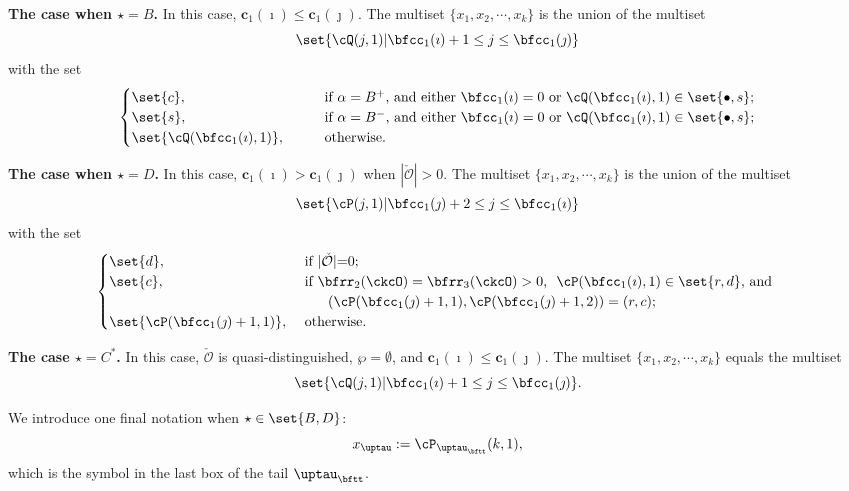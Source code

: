 \documentclass[12pt]{amsart}
\newcommand{\CO}{{\mathcal {O}}}
\numberwithin{equation}{section}
\theoremstyle{remark}
\begin{document}
{\bfseries The case when $\star = B$.} In this case,  $\mathbf c_1(\imath)\leq \mathbf c_1(\jmath)$. The multiset $\{x_1, x_2, \cdots, x_k\}$ is the
union of the multiset
\[
  \set{\cQ(j,1)| \bfcc_{1}(\imath)+1 \leq j \leq  \bfcc_{1}(\jmath) }
\]
with the set
\[
  \begin{cases}
 \set{c}, &
 \qquad
  \text{if $\alpha = B^+$, and either $\bfcc_{1}(\imath)=0$ or $\cQ(\bfcc_{1}(\imath),1)\in \set{\bullet,s}$};  \\
 \set{s},&
  \qquad \text{if $\alpha = B^-$, and either $\bfcc_{1}(\imath)=0$ or $\cQ(\bfcc_{1}(\imath),1)\in \set{\bullet,s}$}; \\
\set{\cQ(\bfcc_{1}(\imath),1)},&
\qquad
\text{otherwise.}
\end{cases}
\]

{\bfseries The case when $\star = D$.} In this case,  $\mathbf c_1(\imath)>\mathbf c_1(\jmath)$ when $|\check \CO|>0$.
The multiset $\{x_1, x_2, \cdots, x_k\}$
is the union of the multiset
\[
\set{\cP(j,1)| \bfcc_{1}(\jmath)+2 \leq j \leq \bfcc_{1}(\imath)}
\]
with the set
\[
\begin{cases}
 \set{d}, &\textrm{ if $|\check \CO|$=0};\\
    \set{c},                          &
    \ \text{if $\bfrr_2(\ckcO)=\bfrr_3(\ckcO)>0$, $\ \cP(\bfcc_1(\imath),1)\in \set{r,d}$,   and }\\   &\qquad ( \cP(\bfcc_{1}(\jmath)+1,1), \cP(\bfcc_{1}(\jmath)+1,2)) = (r,c);                                                                     \\
    \set{\cP(\bfcc_{1}(\jmath)+1,1)}, &
    \    \text{otherwise.}
  \end{cases}
\]


{\bfseries The case $\star = C^*$.}  In this case,  $\check \CO$ is quasi-distinguished,
$\wp=\emptyset$,
and $\mathbf c_1(\imath)\leq \mathbf c_1(\jmath)$.
The multiset $\{x_1, x_2, \cdots, x_k\}$
equals the multiset
\[
  \set{\cQ(j,1)| \bfcc_{1}(\imath)+1 \leq j \leq  \bfcc_{1}(\jmath) }.
\]


We introduce one final notation when $\star \in \set{B,D}$:
\[
x_\uptau := \cP_{\uptau_\bftt}(k,1),
\]
which is the symbol in the last box of the tail $\uptau_\bftt$.
\end{document}
